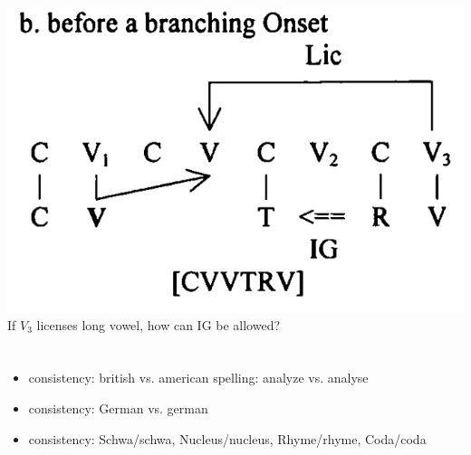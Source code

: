 \documentclass[
  paper=a4,
]{scrartcl}
\begin{document}
\cite[p.~650]{scheer2004}
\includegraphics[width=.5\textwidth]{figures/lic-over-branching-onset.png}
\\If $V_3$ licenses long vowel, how can IG be allowed?

\section*{\TODO{}}

\begin{itemize}
\item consistency: british vs. american spelling: analyze vs. analyse
\item consistency: German vs. german
\item consistency: Schwa/schwa, Nucleus/nucleus, Rhyme/rhyme, Coda/coda
\end{itemize}

\end{document}
